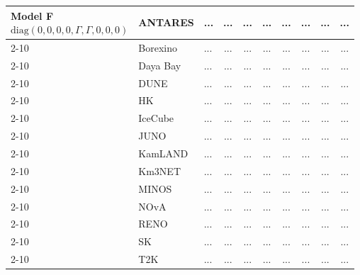 \begin{table}[H]
{\begin{tabular}{|l|l|l||c|c|c|c|c|c|c|}
\multirow{3}{*}{\parbox{3.2cm}{\centering 
Model F \\[0.5ex]
\scriptsize $\mathrm{diag}( 0, 0, 0, 0, \Gamma, \Gamma, 0, 0, 0 )$}}
        & ANTARES          & ... & ... & ... & ... & ... & ... & ... & ... \\ \cline{2-10}
        & Borexino         & ... & ... & ... & ... & ... & ... & ... & ... \\ \cline{2-10}
        & Daya Bay         & ... & ... & ... & ... & ... & ... & ... & ... \\ \cline{2-10}
        & DUNE             & ... & ... & ... & ... & ... & ... & ... & ... \\ \cline{2-10}
        & HK & ... & ... & ... & ... & ... & ... & ... & ... \\ \cline{2-10}
        & IceCube          & ... & ... & ... & ... & ... & ... & ... & ... \\ \cline{2-10}
        & JUNO             & ... & ... & ... & ... & ... & ... & ... & ... \\ \cline{2-10}
        & KamLAND          & ... & ... & ... & ... & ... & ... & ... & ... \\ \cline{2-10}
        & Km3NET           & ... & ... & ... & ... & ... & ... & ... & ... \\ \cline{2-10}
        & MINOS            & ... & ... & ... & ... & ... & ... & ... & ... \\ \cline{2-10}
        & NOvA             & ... & ... & ... & ... & ... & ... & ... & ... \\ \cline{2-10}
        & RENO             & ... & ... & ... & ... & ... & ... & ... & ... \\ \cline{2-10}
        & SK               & ... & ... & ... & ... & ... & ... & ... & ... \\ \cline{2-10}
        & T2K              & ... & ... & ... & ... & ... & ... & ... & ... \\ \hline \hline



\end{tabular}}
\end{table}
